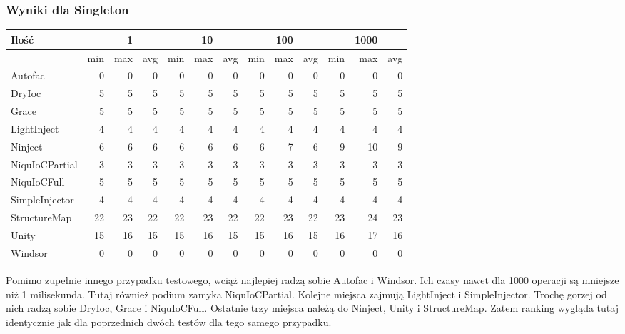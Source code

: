 \documentclass[12pt]{article}
\begin{document}
\subsubsection{Wyniki dla Singleton}
\begin{center}
\begin{small}
	\begin{tabular}{ | l | r r r | r r r | r r r | r r r | }
    		\hline
Ilość & & 1 & & & 10 & & & 100 & & & 1000 & \\ \hline
 & min & max & avg & min & max & avg & min & max & avg & min & max & avg \\ \hline
Autofac & 0 & 0 & 0 & 0 & 0 & 0 & 0 & 0 & 0 & 0 & 0 & 0 \\ \hline
DryIoc & 5 & 5 & 5 & 5 & 5 & 5 & 5 & 5 & 5 & 5 & 5 & 5 \\ \hline
Grace & 5 & 5 & 5 & 5 & 5 & 5 & 5 & 5 & 5 & 5 & 5 & 5 \\ \hline
LightInject & 4 & 4 & 4 & 4 & 4 & 4 & 4 & 4 & 4 & 4 & 4 & 4 \\ \hline
Ninject & 6 & 6 & 6 & 6 & 6 & 6 & 6 & 7 & 6 & 9 & 10 & 9 \\ \hline
NiquIoCPartial & 3 & 3 & 3 & 3 & 3 & 3 & 3 & 3 & 3 & 3 & 3 & 3 \\ \hline
NiquIoCFull & 5 & 5 & 5 & 5 & 5 & 5 & 5 & 5 & 5 & 5 & 5 & 5 \\ \hline
SimpleInjector & 4 & 4 & 4 & 4 & 4 & 4 & 4 & 4 & 4 & 4 & 4 & 4 \\ \hline
StructureMap & 22 & 23 & 22 & 22 & 23 & 22 & 22 & 23 & 22 & 23 & 24 & 23 \\ \hline
Unity & 15 & 16 & 15 & 15 & 16 & 15 & 15 & 16 & 15 & 16 & 17 & 16 \\ \hline
Windsor & 0 & 0 & 0 & 0 & 0 & 0 & 0 & 0 & 0 & 0 & 0 & 0 \\ \hline
  	\end{tabular}
\end{small}
\end{center}
Pomimo zupełnie innego przypadku testowego, wciąż najlepiej radzą sobie Autofac i Windsor. Ich czasy nawet dla 1000 operacji są mniejsze niż 1 milisekunda. Tutaj również podium zamyka NiquIoCPartial. Kolejne miejsca zajmują LightInject i SimpleInjector. Trochę gorzej od nich radzą sobie DryIoc, Grace i NiquIoCFull. Ostatnie trzy miejsca należą do Ninject, Unity i StructureMap. Zatem ranking wygląda tutaj identycznie jak dla poprzednich dwóch testów dla tego samego przypadku.
\end{document}
